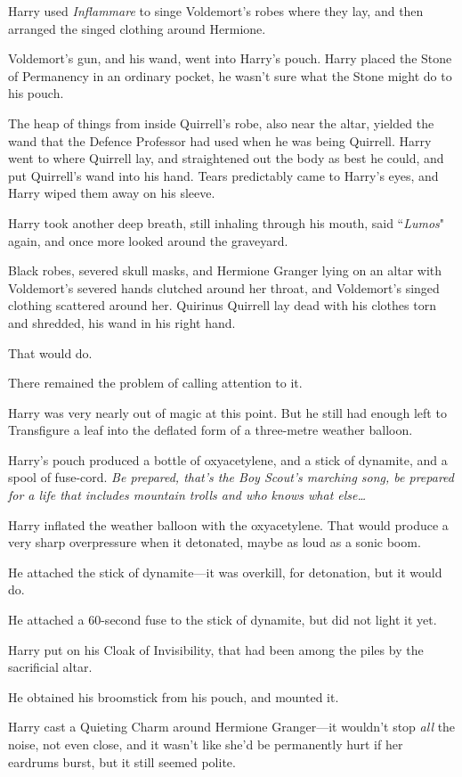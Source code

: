 Harry used \emph{Inflammare} to singe Voldemort's robes where they lay, and then arranged the singed clothing around Hermione.

Voldemort's gun, and his wand, went into Harry's pouch. Harry placed the Stone of Permanency in an ordinary pocket, he wasn't sure what the Stone might do to his pouch.

The heap of things from inside Quirrell's robe, also near the altar, yielded the wand that the Defence Professor had used when he was being Quirrell. Harry went to where Quirrell lay, and straightened out the body as best he could, and put Quirrell's wand into his hand. Tears predictably came to Harry's eyes, and Harry wiped them away on his sleeve.

Harry took another deep breath, still inhaling through his mouth, said ``\emph{Lumos}" again, and once more looked around the graveyard.

Black robes, severed skull masks, and Hermione Granger lying on an altar with Voldemort's severed hands clutched around her throat, and Voldemort's singed clothing scattered around her. Quirinus Quirrell lay dead with his clothes torn and shredded, his wand in his right hand.

That would do.

There remained the problem of calling attention to it.

Harry was very nearly out of magic at this point. But he still had enough left to Transfigure a leaf into the deflated form of a three-metre weather balloon.

Harry's pouch produced a bottle of oxyacetylene, and a stick of dynamite, and a spool of fuse-cord. \emph{Be prepared, that's the Boy Scout's marching song, be prepared for a life that includes mountain trolls and who knows what else…}

Harry inflated the weather balloon with the oxyacetylene. That would produce a very sharp overpressure when it detonated, maybe as loud as a sonic boom.

He attached the stick of dynamite—it was overkill, for detonation, but it would do.

He attached a 60-second fuse to the stick of dynamite, but did not light it yet.

Harry put on his Cloak of Invisibility, that had been among the piles by the sacrificial altar.

He obtained his broomstick from his pouch, and mounted it.

Harry cast a Quieting Charm around Hermione Granger—it wouldn't stop \emph{all} the noise, not even close, and it wasn't like she'd be permanently hurt if her eardrums burst, but it still seemed polite.

